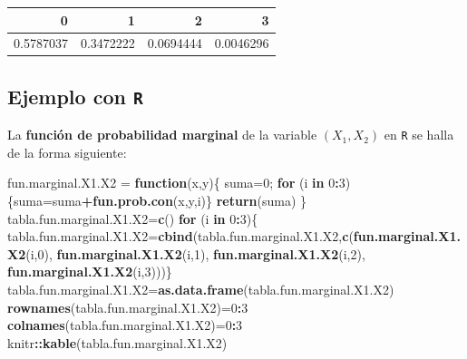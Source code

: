 \documentclass[]{book}
\newenvironment{Shaded}{\begin{snugshade}}{\end{snugshade}}
\newcommand{\ControlFlowTok}[1]{\textcolor[rgb]{0.13,0.29,0.53}{\textbf{#1}}}
\newcommand{\DecValTok}[1]{\textcolor[rgb]{0.00,0.00,0.81}{#1}}
\newcommand{\KeywordTok}[1]{\textcolor[rgb]{0.13,0.29,0.53}{\textbf{#1}}}
\newcommand{\NormalTok}[1]{#1}
\newcommand{\OperatorTok}[1]{\textcolor[rgb]{0.81,0.36,0.00}{\textbf{#1}}}
\newcommand{\StringTok}[1]{\textcolor[rgb]{0.31,0.60,0.02}{#1}}
\begin{document}
\begin{tabular}{r|r|r|r}
\hline
0 & 1 & 2 & 3\\
\hline
0.5787037 & 0.3472222 & 0.0694444 & 0.0046296\\
\hline
\end{tabular}

\hypertarget{ejemplo-con-r-19}{%
\subsection{\texorpdfstring{Ejemplo con \texttt{R}}{Ejemplo con R}}\label{ejemplo-con-r-19}}

La \textbf{función de probabilidad marginal} de la variable \((X_1,X_2)\) en \texttt{R} se halla de la forma siguiente:

\begin{Shaded}
\begin{Highlighting}[]
\NormalTok{fun.marginal.X1.X2 =}\StringTok{ }\ControlFlowTok{function}\NormalTok{(x,y)\{}
\NormalTok{  suma=}\DecValTok{0}\NormalTok{;}
  \ControlFlowTok{for}\NormalTok{ (i }\ControlFlowTok{in} \DecValTok{0}\OperatorTok{:}\DecValTok{3}\NormalTok{)\{suma=suma}\OperatorTok{+}\KeywordTok{fun.prob.con}\NormalTok{(x,y,i)\}}
  \KeywordTok{return}\NormalTok{(suma)}
\NormalTok{\}}
\NormalTok{tabla.fun.marginal.X1.X2=}\KeywordTok{c}\NormalTok{()}
\ControlFlowTok{for}\NormalTok{ (i }\ControlFlowTok{in} \DecValTok{0}\OperatorTok{:}\DecValTok{3}\NormalTok{)\{}
\NormalTok{  tabla.fun.marginal.X1.X2=}\KeywordTok{cbind}\NormalTok{(tabla.fun.marginal.X1.X2,}\KeywordTok{c}\NormalTok{(}\KeywordTok{fun.marginal.X1.X2}\NormalTok{(i,}\DecValTok{0}\NormalTok{),}
                                                            \KeywordTok{fun.marginal.X1.X2}\NormalTok{(i,}\DecValTok{1}\NormalTok{),}
                                                            \KeywordTok{fun.marginal.X1.X2}\NormalTok{(i,}\DecValTok{2}\NormalTok{),}
                                                            \KeywordTok{fun.marginal.X1.X2}\NormalTok{(i,}\DecValTok{3}\NormalTok{)))\}}
\NormalTok{tabla.fun.marginal.X1.X2=}\KeywordTok{as.data.frame}\NormalTok{(tabla.fun.marginal.X1.X2)}
\KeywordTok{rownames}\NormalTok{(tabla.fun.marginal.X1.X2)=}\DecValTok{0}\OperatorTok{:}\DecValTok{3}
\KeywordTok{colnames}\NormalTok{(tabla.fun.marginal.X1.X2)=}\DecValTok{0}\OperatorTok{:}\DecValTok{3}
\NormalTok{knitr}\OperatorTok{::}\KeywordTok{kable}\NormalTok{(tabla.fun.marginal.X1.X2)}
\end{Highlighting}
\end{Shaded}
\end{document}
